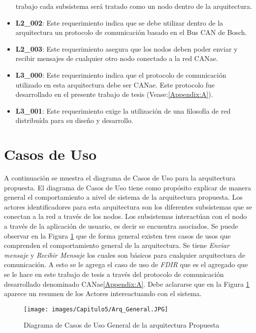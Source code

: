 \begin{itemize}
  trabajo cada subsistema será tratado como un nodo dentro de la arquitectura.
\item\textbf{L2\_002}: Este requerimiento indica que se debe utilizar dentro de
  la arquitectura un protocolo de comunicación basado en el Bus CAN de Bosch.
\item\textbf{L2\_003}: Este requerimiento asegura que los nodos deben poder enviar
  y recibir mensajes de cualquier otro nodo conectado a la red CANae.
\item\textbf{L3\_000}: Este requerimiento indica que el protocolo de
  comunicación utilizado en esta arquitectura debe ser CANae. Este protocolo
  fue desarrollado en el presente trabajo de tesis (Vease:\ref{Appendix:A}).
\item\textbf{L3\_001}: Este requerimiento exige la utilización de una
  filosofía de red distribuída para su diseño y desarrollo.
\end{itemize}

\section{Casos de Uso}
A continuación se muestra el diagrama de Casos de Uso para la arquitectura propuesta.
El diagrama de Casos de Uso tiene como propósito explicar de manera general
el comportamiento a nivel de sistema de la arquitectura propuesta.
Los actores identificadores para esta arquitectura son los diferentes
subsistemas que se conectan a la red a través de los nodos.
Los subsistemas interactúan con el nodo a través de
la aplicación de usuario, es decir se encuentra asociados.
Se puede observar en la Figura \ref{fig:DiagramaCUArqPropuestaGENERAL}
que de forma general existen tres casos de usos que comprenden el comportamiento
general de la arquitectura. Se tiene \textit{Enviar mensaje} y \textit{Recibir
  Mensaje} los cuales son básicos para cualquier arquitectura de comunicación. A
esto se le agrega el caso de uso de \textit{FDIR} que es el agregado que se le
hace en este trabajo de tesis a través del protocolo de comunicación desarrollado
denominado CANae\ref{Appendix:A}. Debe aclararse que en 
la Figura \ref{fig:DiagramaCUArqPropuestaGENERAL}
aparece un resumen de los Actores intereactuando con el sistema. 

\begin{figure}[h!]
 \centering
 \texttt{[image: images/Capitulo5/Arq\_General.JPG]}
  \caption{Diagrama de Casos de Uso General de la arquitectura Propuesta}
\label{fig:DiagramaCUArqPropuestaGENERAL}
\end{figure} 

